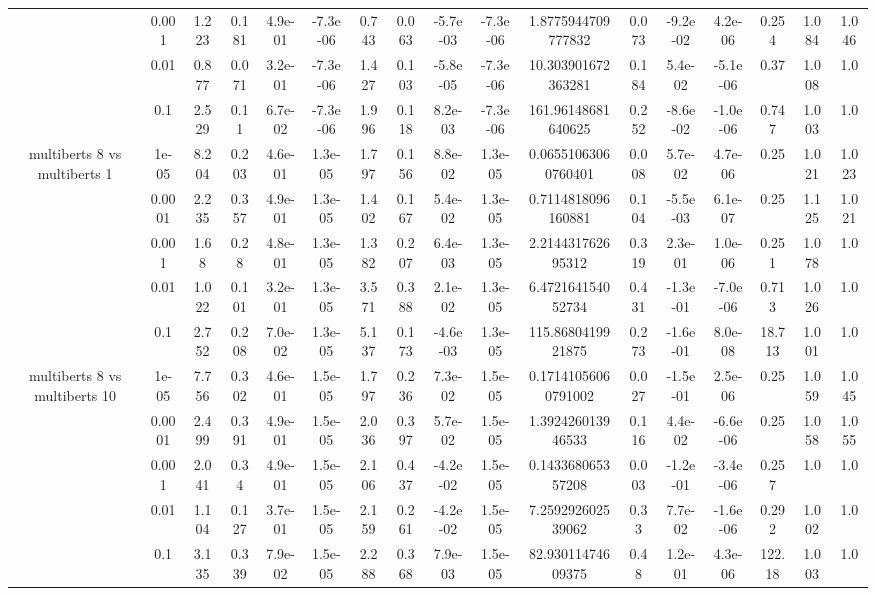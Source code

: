 \begin{tabular}{|c|c|c|c|c|c|c|c|c|c|c|c|c|c|c|c|c|}
 & 0.001 & 1.223 & 0.181 & 4.9e-01 & -7.3e-06 & 0.743 & 0.063 & -5.7e-03 & -7.3e-06 & 1.8775944709777832 & 0.073 & -9.2e-02 & 4.2e-06 & 0.254 & 1.084 & 1.046 \\
 & 0.01 & 0.877 & 0.071 & 3.2e-01 & -7.3e-06 & 1.427 & 0.103 & -5.8e-05 & -7.3e-06 & 10.303901672363281 & 0.184 & 5.4e-02 & -5.1e-06 & 0.37 & 1.008 & 1.0 \\
 & 0.1 & 2.529 & 0.11 & 6.7e-02 & -7.3e-06 & 1.996 & 0.118 & 8.2e-03 & -7.3e-06 & 161.96148681640625 & 0.252 & -8.6e-02 & -1.0e-06 & 0.747 & 1.003 & 1.0 \\
\hline
\multirow{5}{*}{multiberts 8 vs multiberts 1} & 1e-05 & 8.204 & 0.203 & 4.6e-01 & 1.3e-05 & 1.797 & 0.156 & 8.8e-02 & 1.3e-05 & 0.06551063060760401 & 0.008 & 5.7e-02 & 4.7e-06 & 0.25 & 1.021 & 1.023 \\
 & 0.0001 & 2.235 & 0.357 & 4.9e-01 & 1.3e-05 & 1.402 & 0.167 & 5.4e-02 & 1.3e-05 & 0.7114818096160881 & 0.104 & -5.5e-03 & 6.1e-07 & 0.25 & 1.125 & 1.021 \\
 & 0.001 & 1.68 & 0.28 & 4.8e-01 & 1.3e-05 & 1.382 & 0.207 & 6.4e-03 & 1.3e-05 & 2.214431762695312 & 0.319 & 2.3e-01 & 1.0e-06 & 0.251 & 1.078 & 1.0 \\
 & 0.01 & 1.022 & 0.101 & 3.2e-01 & 1.3e-05 & 3.571 & 0.388 & 2.1e-02 & 1.3e-05 & 6.472164154052734 & 0.431 & -1.3e-01 & -7.0e-06 & 0.713 & 1.026 & 1.0 \\
 & 0.1 & 2.752 & 0.208 & 7.0e-02 & 1.3e-05 & 5.137 & 0.173 & -4.6e-03 & 1.3e-05 & 115.8680419921875 & 0.273 & -1.6e-01 & 8.0e-08 & 18.713 & 1.001 & 1.0 \\
\hline
\multirow{5}{*}{multiberts 8 vs multiberts 10} & 1e-05 & 7.756 & 0.302 & 4.6e-01 & 1.5e-05 & 1.797 & 0.236 & 7.3e-02 & 1.5e-05 & 0.17141056060791002 & 0.027 & -1.5e-01 & 2.5e-06 & 0.25 & 1.059 & 1.045 \\
 & 0.0001 & 2.499 & 0.391 & 4.9e-01 & 1.5e-05 & 2.036 & 0.397 & 5.7e-02 & 1.5e-05 & 1.392426013946533 & 0.116 & 4.4e-02 & -6.6e-06 & 0.25 & 1.058 & 1.055 \\
 & 0.001 & 2.041 & 0.34 & 4.9e-01 & 1.5e-05 & 2.106 & 0.437 & -4.2e-02 & 1.5e-05 & 0.143368065357208 & 0.003 & -1.2e-01 & -3.4e-06 & 0.257 & 1.0 & 1.0 \\
 & 0.01 & 1.104 & 0.127 & 3.7e-01 & 1.5e-05 & 2.159 & 0.261 & -4.2e-02 & 1.5e-05 & 7.259292602539062 & 0.33 & 7.7e-02 & -1.6e-06 & 0.292 & 1.002 & 1.0 \\
 & 0.1 & 3.135 & 0.339 & 7.9e-02 & 1.5e-05 & 2.288 & 0.368 & 7.9e-03 & 1.5e-05 & 82.93011474609375 & 0.48 & 1.2e-01 & 4.3e-06 & 122.18 & 1.003 & 1.0 \\

\end{tabular}

